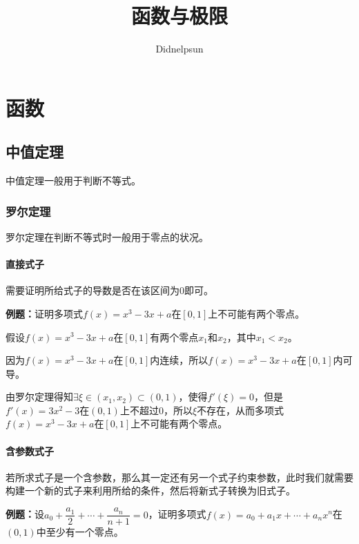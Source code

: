 \documentclass[UTF8, 12pt]{ctexart}
\author{Didnelpsun}
\title{函数与极限}
\date{}
\begin{document}
\maketitle
\thispagestyle{empty}
\tableofcontents
\thispagestyle{empty}
\newpage
\pagestyle{plain}
\setcounter{page}{1}

\section{函数}

\subsection{中值定理}

中值定理一般用于判断不等式。

\subsubsection{罗尔定理}

罗尔定理在判断不等式时一般用于零点的状况。

\paragraph{直接式子} \leavevmode \medskip

需要证明所给式子的导数是否在该区间为0即可。

\textbf{例题：}证明多项式$f(x)=x^3-3x+a$在$[0,1]$上不可能有两个零点。

假设$f(x)=x^3-3x+a$在$[0,1]$有两个零点$x_1$和$x_2$，其中$x_1<x_2$。

因为$f(x)=x^3-3x+a$在$[0,1]$内连续，所以$f(x)=x^3-3x+a$在$[0,1]$内可导。

由罗尔定理得知$\exists\xi\in(x_1,x_2)\subset(0,1)$，使得$f'(\xi)=0$，但是$f'(x)=3x^2-3$在$(0,1)$上不超过0，所以$\xi$不存在，从而多项式$f(x)=x^3-3x+a$在$[0,1]$上不可能有两个零点。

\paragraph{含参数式子} \leavevmode \medskip

若所求式子是一个含参数，那么其一定还有另一个式子约束参数，此时我们就需要构建一个新的式子来利用所给的条件，然后将新式子转换为旧式子。

\textbf{例题：}设$a_0+\dfrac{a_1}{2}+\cdots+\dfrac{a_n}{n+1}=0$，证明多项式$f(x)=a_0+a_1x+\cdots+a_nx^n$在$(0,1)$中至少有一个零点。
\end{document}
